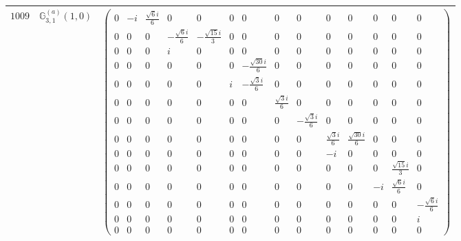 \documentclass[fleqn,8pt,landscape]{jsarticle}
\begin{document}
\begin{center}
\begin{longtable}{ccc}
$ 1009 $ & $ \mathbb{G}_{3,1}^{(a)}(1,0) $ & $ \begin{pmatrix} 0 & - i & \frac{\sqrt{6} i}{6} & 0 & 0 & 0 & 0 & 0 & 0 & 0 & 0 & 0 & 0 & 0 \\ 0 & 0 & 0 & - \frac{\sqrt{6} i}{6} & - \frac{\sqrt{15} i}{3} & 0 & 0 & 0 & 0 & 0 & 0 & 0 & 0 & 0 \\ 0 & 0 & 0 & i & 0 & 0 & 0 & 0 & 0 & 0 & 0 & 0 & 0 & 0 \\ 0 & 0 & 0 & 0 & 0 & 0 & - \frac{\sqrt{30} i}{6} & 0 & 0 & 0 & 0 & 0 & 0 & 0 \\ 0 & 0 & 0 & 0 & 0 & i & - \frac{\sqrt{3} i}{6} & 0 & 0 & 0 & 0 & 0 & 0 & 0 \\ 0 & 0 & 0 & 0 & 0 & 0 & 0 & \frac{\sqrt{3} i}{6} & 0 & 0 & 0 & 0 & 0 & 0 \\ 0 & 0 & 0 & 0 & 0 & 0 & 0 & 0 & - \frac{\sqrt{3} i}{6} & 0 & 0 & 0 & 0 & 0 \\ 0 & 0 & 0 & 0 & 0 & 0 & 0 & 0 & 0 & \frac{\sqrt{3} i}{6} & \frac{\sqrt{30} i}{6} & 0 & 0 & 0 \\ 0 & 0 & 0 & 0 & 0 & 0 & 0 & 0 & 0 & - i & 0 & 0 & 0 & 0 \\ 0 & 0 & 0 & 0 & 0 & 0 & 0 & 0 & 0 & 0 & 0 & 0 & \frac{\sqrt{15} i}{3} & 0 \\ 0 & 0 & 0 & 0 & 0 & 0 & 0 & 0 & 0 & 0 & 0 & - i & \frac{\sqrt{6} i}{6} & 0 \\ 0 & 0 & 0 & 0 & 0 & 0 & 0 & 0 & 0 & 0 & 0 & 0 & 0 & - \frac{\sqrt{6} i}{6} \\ 0 & 0 & 0 & 0 & 0 & 0 & 0 & 0 & 0 & 0 & 0 & 0 & 0 & i \\ 0 & 0 & 0 & 0 & 0 & 0 & 0 & 0 & 0 & 0 & 0 & 0 & 0 & 0 \end{pmatrix} $ \\ \hline

\end{longtable}
\end{center}
\end{document}
